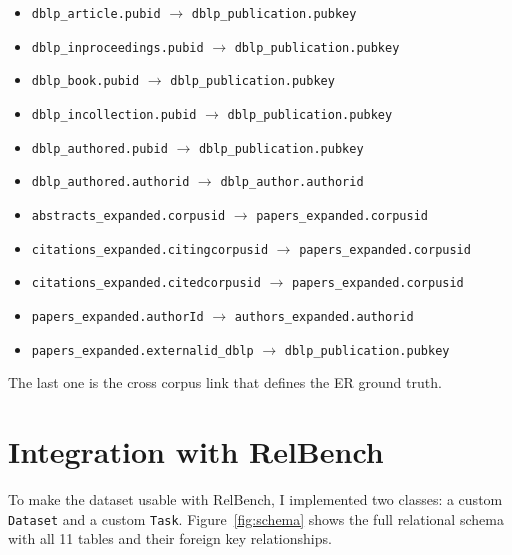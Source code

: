 \documentclass{article}
\begin{document}
\begin{itemize}
    \item \texttt{dblp\_article.pubid} $\to$ \texttt{dblp\_publication.pubkey}
    \item \texttt{dblp\_inproceedings.pubid} $\to$ \texttt{dblp\_publication.pubkey}
    \item \texttt{dblp\_book.pubid} $\to$ \texttt{dblp\_publication.pubkey}
    \item \texttt{dblp\_incollection.pubid} $\to$ \texttt{dblp\_publication.pubkey}
    \item \texttt{dblp\_authored.pubid} $\to$ \texttt{dblp\_publication.pubkey}
    \item \texttt{dblp\_authored.authorid} $\to$ \texttt{dblp\_author.authorid}
    \item \texttt{abstracts\_expanded.corpusid} $\to$ \texttt{papers\_expanded.corpusid}
    \item \texttt{citations\_expanded.citingcorpusid} $\to$ \texttt{papers\_expanded.corpusid}
    \item \texttt{citations\_expanded.citedcorpusid} $\to$ \texttt{papers\_expanded.corpusid}
    \item \texttt{papers\_expanded.authorId} $\to$ \texttt{authors\_expanded.authorid}
    \item \texttt{papers\_expanded.externalid\_dblp} $\to$ \texttt{dblp\_publication.pubkey}
\end{itemize}

The last one is the cross corpus link that defines the ER ground truth.


\section{Integration with RelBench}
\label{sec:relbench}

To make the dataset usable with RelBench, I implemented two classes: a custom \texttt{Dataset} and a custom \texttt{Task}.
Figure~\ref{fig:schema} shows the full relational schema with all 11 tables and their foreign key relationships.
\end{document}
